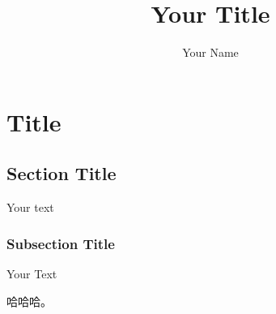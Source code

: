 \documentclass[10pt]{memoir}
\title{Your Title}
\author{Your Name}
\date{}
\begin{document}
\maketitle
\chapter{Title}

\section{Section Title}
Your text

\subsection{Subsection Title}
Your Text

哈哈哈。
\end{document}
